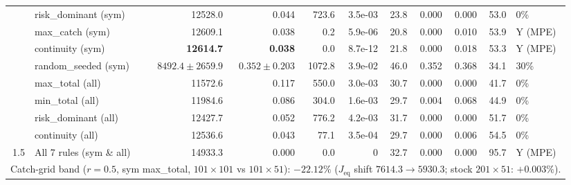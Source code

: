 \begin{tabular}{rlrrrrrrrrl}
 & risk\_dominant (sym) & 12528.0 & 0.044 & 723.6 & 3.5e-03 & 23.8 & 0.000 & 0.000 & 53.0 & 0\% \\
 & max\_catch (sym) & 12609.1 & 0.038 & 0.2 & 5.9e-06 & 20.8 & 0.000 & 0.010 & 53.9 & Y (MPE) \\
 & continuity (sym) & \textbf{12614.7} & \textbf{0.038} & 0.0 & 8.7e-12 & 21.8 & 0.000 & 0.018 & 53.3 & Y (MPE) \\
 & random\_seeded (sym) & $8492.4 \pm 2659.9$ & $0.352 \pm 0.203$ & 1072.8 & 3.9e-02 & 46.0 & 0.352 & 0.368 & 34.1 & 30\% \\
 & max\_total (all) & 11572.6 & 0.117 & 550.0 & 3.0e-03 & 30.7 & 0.000 & 0.000 & 41.7 & 0\% \\
 & min\_total (all) & 11984.6 & 0.086 & 304.0 & 1.6e-03 & 29.7 & 0.004 & 0.068 & 44.9 & 0\% \\
 & risk\_dominant (all) & 12427.7 & 0.052 & 776.2 & 4.2e-03 & 31.7 & 0.000 & 0.000 & 51.7 & 0\% \\
 & continuity (all) & 12536.6 & 0.043 & 77.1 & 3.5e-04 & 29.7 & 0.000 & 0.006 & 54.5 & 0\% \\
\midrule
1.5 & All 7 rules (sym \& all) & 14933.3 & 0.000 & 0.0 & 0 & 32.7 & 0.000 & 0.000 & 95.7 & Y (MPE) \\
\midrule
\multicolumn{11}{l}{\footnotesize Catch-grid band ($r=0.5$, sym max\_total, $101\times 101$ vs $101\times 51$): $-22.12\%$ ($J_{\text{eq}}$ shift $7614.3 \to 5930.3$; stock $201\times 51$: $+0.003\%$).} \\
\bottomrule
\end{tabular}
